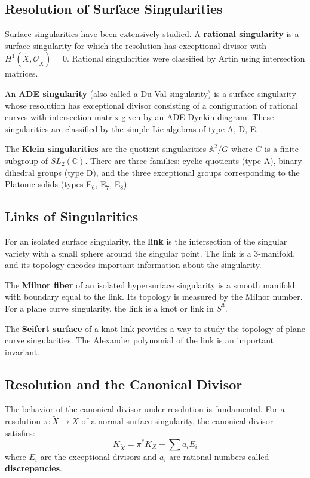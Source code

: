 \subsection*{Resolution of Surface Singularities}

Surface singularities have been extensively studied. A \textbf{rational singularity} is a surface singularity for which the resolution has exceptional divisor with $H^1(\tilde{X}, \mathcal{O}_{\tilde{X}}) = 0$. Rational singularities were classified by Artin using intersection matrices.

An \textbf{ADE singularity} (also called a Du Val singularity) is a surface singularity whose resolution has exceptional divisor consisting of a configuration of rational curves with intersection matrix given by an ADE Dynkin diagram. These singularities are classified by the simple Lie algebras of type A, D, E.

The \textbf{Klein singularities} are the quotient singularities $\mathbb{A}^2 / G$ where $G$ is a finite subgroup of $SL_2(\mathbb{C})$. There are three families: cyclic quotients (type A), binary dihedral groups (type D), and the three exceptional groups corresponding to the Platonic solids (types E$_6$, E$_7$, E$_8$).

\subsection*{Links of Singularities}

For an isolated surface singularity, the \textbf{link} is the intersection of the singular variety with a small sphere around the singular point. The link is a 3-manifold, and its topology encodes important information about the singularity.

The \textbf{Milnor fiber} of an isolated hypersurface singularity is a smooth manifold with boundary equal to the link. Its topology is measured by the Milnor number. For a plane curve singularity, the link is a knot or link in $S^3$.

The \textbf{Seifert surface} of a knot link provides a way to study the topology of plane curve singularities. The Alexander polynomial of the link is an important invariant.

\subsection*{Resolution and the Canonical Divisor}

The behavior of the canonical divisor under resolution is fundamental. For a resolution $\pi: \tilde{X} \to X$ of a normal surface singularity, the canonical divisor satisfies:
\[
K_{\tilde{X}} = \pi^* K_X + \sum a_i E_i
\]
where $E_i$ are the exceptional divisors and $a_i$ are rational numbers called \textbf{discrepancies}.

